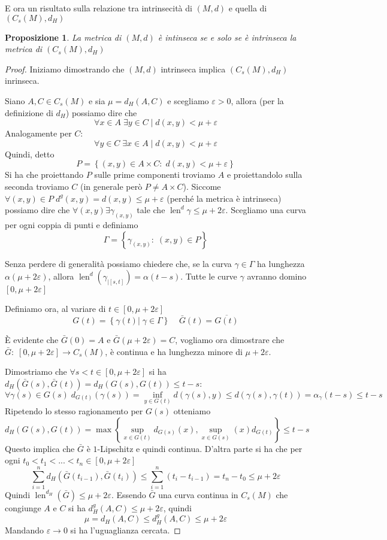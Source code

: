 \documentclass[a4paper,10pt]{article}
\newcounter{counter1}
\theoremstyle{plain}
\newtheorem{mypro}[counter1]{Proposizione}
\theoremstyle{definition}
\theoremstyle{remark}
\newcommand{\obar}[1]{\overline{#1}}
\newcommand{\set}[1]{\left\{#1\right\}}
\newcommand{\pa}[1]{\left(#1\right)}
\newcommand{\bra}[1]{\left[#1\right]}
\DeclareMathOperator{\len}{len}
\begin{document}
E ora un risultato sulla relazione tra intrinsecità di $(M,d)$ e
quella di $\pa{C_s(M),d_H}$
\begin{mypro}
  La metrica di $(M,d)$ è intinseca se e solo se è intrinseca la
  metrica di $(C_s(M),d_H)$
\end{mypro}
\begin{proof}
  Iniziamo dimostrando che $(M,d)$ intrinseca implica $(C_s(M),d_H)$
  inrinseca.

  Siano $A,C \in C_s(M)$ e sia $\mu = d_H(A,C)$ e scegliamo
  $\varepsilon >0$, allora (per la definizione di $d_H$) possiamo dire
  che
  \[ \forall x \in A\; \exists y \in C \mid d(x,y) < \mu +
  \varepsilon \]
  Analogamente per $C$:
  \[ \forall y \in C\; \exists x \in A \mid d(x,y) < \mu +
  \varepsilon \]
  Quindi, detto
  \[ P = \set{(x,y)\in A\times C:\; d(x,y) < \mu + \varepsilon} \]
  Si ha che proiettando $P$ sulle prime componenti troviamo $A$ e
  proiettandolo sulla seconda troviamo $C$ (in generale però $P \neq A
  \times C$).  Siccome $\forall (x,y) \in P\; d^g(x,y) = d(x,y) \le \mu
  + \varepsilon$ (perché la metrica è intrinseca) possiamo dire che
  $\forall (x,y) \exists \gamma_{(x,y)}$ tale che $\len ^d \gamma \le
  \mu + 2 \varepsilon$. Scegliamo una curva per ogni coppia di punti e
  definiamo
  \[ \Gamma = \set{\gamma _{(x,y)} :\; (x,y) \in P} \]

  Senza perdere di generalità possiamo chiedere che, se la curva
  $\gamma \in \Gamma$ ha lunghezza $\alpha (\mu + 2
  \varepsilon )$, allora $\len ^d \pa{ \gamma _{|\bra{s,t}}} = \alpha
  (t-s)$. Tutte le curve $\gamma$ avranno domino $\bra{0,\mu
    + 2 \varepsilon}$

  Definiamo ora, al variare di $t\in \bra{0,\mu + 2 \varepsilon}$
  \[ G(t) = \set{\gamma (t) | \; \gamma \in \Gamma} \;\;\;\; \bar G(t)
  = \obar{ G(t)} \]

  \`E evidente che $\bar G(0) = A$ e $\bar G(\mu + 2 \varepsilon) =
  C$, vogliamo ora dimostrare che $\bar G:\; \bra{0,\mu + 2
    \varepsilon} \to C_s(M)$, \`e continua e ha lunghezza minore di
  $\mu + 2 \varepsilon$.
  
  Dimostriamo che $\forall s<t \in \bra{0,\mu + 2 \varepsilon}$ si ha
  $d_H(\bar G(s),\bar G(t)) = d_H(G(s),G(t)) \le t-s$:
  \[ \forall \gamma(s) \in G(s) \; d_{G(t)}(\gamma(s)) = \inf _{y \in
    G(t)} d(\gamma(s),y) \le d(\gamma(s),\gamma(t)) = \alpha
  _{\gamma} (t-s) \le t-s \]
  Ripetendo lo stesso ragionamento per $G(s)$ otteniamo
  \[ d_H(G(s), G(t)) = \max\set{\sup_{x\in G(t)} d_{G(s)}(x) , \sup
    _{x\in G(s)} (x) d_{G(t)} } \le t-s \]
  Questo implica che $\bar G$ è $1$-Lipschitz e quindi
  continua. D'altra parte si ha che per ogni $t_0< t_1< ... < t_n \in
  \bra{0,\mu + 2 \varepsilon}$ 
  \[ \sum _{i=1} ^n d_H(\bar G(t_{i-1}), \bar G(t_i)) \le \sum _{i=1}
  ^n (t_i - t_{i-1}) = t_n - t_0 \le \mu + 2\varepsilon \]
  Quindi $\len ^{d_H}(\bar G) \le \mu + 2 \varepsilon$.
  Essendo $\bar G$ una curva continua in $C_s(M)$ che congiunge $A$ e
  $C$ si ha $d_H ^g (A,C) \le \mu + 2\varepsilon $, quindi
  \[ \mu = d_H (A,C) \le d_H^g(A,C) \le \mu + 2\varepsilon \]
  Mandando $\varepsilon \to 0$ si ha l'uguaglianza cercata.


\end{proof}
\end{document}
